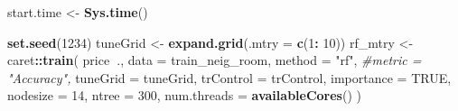 \documentclass[
]{article}
\newenvironment{Shaded}{\begin{snugshade}}{\end{snugshade}}
\newcommand{\CommentTok}[1]{\textcolor[rgb]{0.56,0.35,0.01}{\textit{#1}}}
\newcommand{\DataTypeTok}[1]{\textcolor[rgb]{0.13,0.29,0.53}{#1}}
\newcommand{\DecValTok}[1]{\textcolor[rgb]{0.00,0.00,0.81}{#1}}
\newcommand{\KeywordTok}[1]{\textcolor[rgb]{0.13,0.29,0.53}{\textbf{#1}}}
\newcommand{\NormalTok}[1]{#1}
\newcommand{\OperatorTok}[1]{\textcolor[rgb]{0.81,0.36,0.00}{\textbf{#1}}}
\newcommand{\OtherTok}[1]{\textcolor[rgb]{0.56,0.35,0.01}{#1}}
\newcommand{\StringTok}[1]{\textcolor[rgb]{0.31,0.60,0.02}{#1}}
\begin{document}
\begin{Shaded}
\begin{Highlighting}[]
\NormalTok{start.time <-}\StringTok{ }\KeywordTok{Sys.time}\NormalTok{()}

\KeywordTok{set.seed}\NormalTok{(}\DecValTok{1234}\NormalTok{)}
\NormalTok{tuneGrid <-}\StringTok{ }\KeywordTok{expand.grid}\NormalTok{(}\DataTypeTok{.mtry =} \KeywordTok{c}\NormalTok{(}\DecValTok{1}\OperatorTok{:}\StringTok{ }\DecValTok{10}\NormalTok{))}
\NormalTok{rf_mtry <-}\StringTok{ }\NormalTok{caret}\OperatorTok{::}\KeywordTok{train}\NormalTok{(}
\NormalTok{  price}\OperatorTok{~}\NormalTok{.,}
  \DataTypeTok{data =}\NormalTok{ train_neig_room,}
  \DataTypeTok{method =} \StringTok{"rf"}\NormalTok{,}
  \CommentTok{#metric = "Accuracy",}
  \DataTypeTok{tuneGrid =}\NormalTok{ tuneGrid,}
  \DataTypeTok{trControl =}\NormalTok{ trControl,}
  \DataTypeTok{importance =} \OtherTok{TRUE}\NormalTok{,}
  \DataTypeTok{nodesize =} \DecValTok{14}\NormalTok{,}
  \DataTypeTok{ntree =} \DecValTok{300}\NormalTok{,}
  \DataTypeTok{num.threads =} \KeywordTok{availableCores}\NormalTok{()}
\NormalTok{)}
\end{Highlighting}
\end{Shaded}
\end{document}
